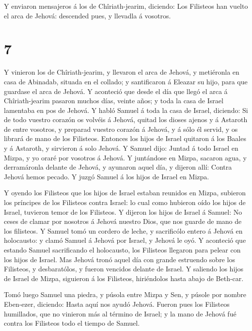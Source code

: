  Y enviaron mensajeros á los de Chîriath-jearim, diciendo:
Los Filisteos han vuelto el arca de Jehová: descended pues, y llevadla á
vosotros.

\hypertarget{section-6}{%
\section{7}\label{section-6}}

 Y vinieron los de Chîriath-jearim, y llevaron el arca de
Jehová, y metiéronla en casa de Abinadab, situada en el collado; y
santificaron á Eleazar su hijo, para que guardase el arca de Jehová.
 Y aconteció que desde el día que llegó el arca á
Chîriath-jearim pasaron muchos días, veinte años; y toda la casa de
Israel lamentaba en pos de Jehová.  Y habló Samuel á toda la
casa de Israel, diciendo: Si de todo vuestro corazón os volvéis á
Jehová, quitad los dioses ajenos y á Astaroth de entre vosotros, y
preparad vuestro corazón á Jehová, y á sólo él servid, y os librará de
mano de los Filisteos.  Entonces los hijos de Israel
quitaron á los Baales y á Astaroth, y sirvieron á solo Jehová.
 Y Samuel dijo: Juntad á todo Israel en Mizpa, y yo oraré
por vosotros á Jehová.  Y juntándose en Mizpa, sacaron agua,
y derramáronla delante de Jehová, y ayunaron aquel día, y dijeron allí:
Contra Jehová hemos pecado. Y juzgó Samuel á los hijos de Israel en
Mizpa.

 Y oyendo los Filisteos que los hijos de Israel estaban
reunidos en Mizpa, subieron los príncipes de los Filisteos contra
Israel: lo cual como hubieron oído los hijos de Israel, tuvieron temor
de los Filisteos.  Y dijeron los hijos de Israel á Samuel:
No ceses de clamar por nosotros á Jehová nuestro Dios, que nos guarde de
mano de los filisteos.  Y Samuel tomó un cordero de leche, y
sacrificólo entero á Jehová en holocausto: y clamó Samuel á Jehová por
Israel, y Jehová le oyó.  Y aconteció que estando Samuel
sacrificando el holocausto, los Filisteos llegaron para pelear con los
hijos de Israel. Mas Jehová tronó aquel día con grande estruendo sobre
los Filisteos, y desbaratólos, y fueron vencidos delante de Israel.
 Y saliendo los hijos de Israel de Mizpa, siguieron á los
Filisteos, hiriéndolos hasta abajo de Beth-car.

 Tomó luego Samuel una piedra, y púsola entre Mizpa y Sen,
y púsole por nombre Eben-ezer, diciendo: Hasta aquí nos ayudó Jehová.
 Fueron pues los Filisteos humillados, que no vinieron más
al término de Israel; y la mano de Jehová fué contra los Filisteos todo
el tiempo de Samuel.

